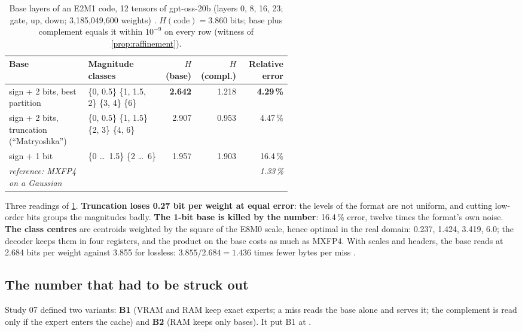 \begin{table}[ht]
\centering\small
\caption[Base layers of an E2M1 code]{Base layers of an E2M1 code, 12 tensors of gpt-oss-20b (layers 0, 8, 16, 23; gate, up, down; 3{,}185{,}049{,}600 weights) \mes. $H(\text{code}) = 3.860$ bits; base plus complement equals it within $10^{-9}$ on every row (witness of \cref{prop:raffinement}).}
\label{tab:bases}
\begin{tabular}{@{}p{0.28\linewidth}p{0.27\linewidth}rrr@{}}
\toprule
Base & Magnitude classes & $H$(base) & $H$(compl.) & Relative error \\
\midrule
sign + 2 bits, best partition & \{0, 0.5\} \{1, 1.5, 2\} \{3, 4\} \{6\} & \textbf{2.642} & 1.218 & \textbf{4.29\,\%} \\
sign + 2 bits, truncation (``Matryoshka'') & \{0, 0.5\} \{1, 1.5\} \{2, 3\} \{4, 6\} & 2.907 & 0.953 & 4.47\,\% \\
sign + 1 bit & \{0 \ldots\ 1.5\} \{2 \ldots\ 6\} & 1.957 & 1.903 & 16.4\,\% \\
\emph{reference: MXFP4 on a Gaussian} & & & & \emph{1.33\,\%} \\
\bottomrule
\end{tabular}
\end{table}

Three readings of \cref{tab:bases}. \textbf{Truncation loses 0.27 bit per weight at equal error}: the levels of the format are not uniform, and cutting low-order bits groups the magnitudes badly. \textbf{The 1-bit base is killed by the number}: 16.4\,\% error, twelve times the format's own noise. \textbf{The class centres} are centroids weighted by the square of the E8M0 scale, hence optimal in the real domain: 0.237, 1.424, 3.419, 6.0; the decoder keeps them in four registers, and the product on the base costs as much as MXFP4. With scales and headers, the base reads at 2.684 bits per weight against 3.855 for lossless: $3.855/2.684 = 1.436$ times fewer bytes per miss \calc.

\subsection{The number that had to be struck out}\label{sec:correction-b1}

Study 07 defined two variants: \textbf{B1} (VRAM and RAM keep exact experts; a miss reads the base alone and serves it; the complement is read only if the expert enters the cache) and \textbf{B2} (RAM keeps only bases). It put B1 at .

